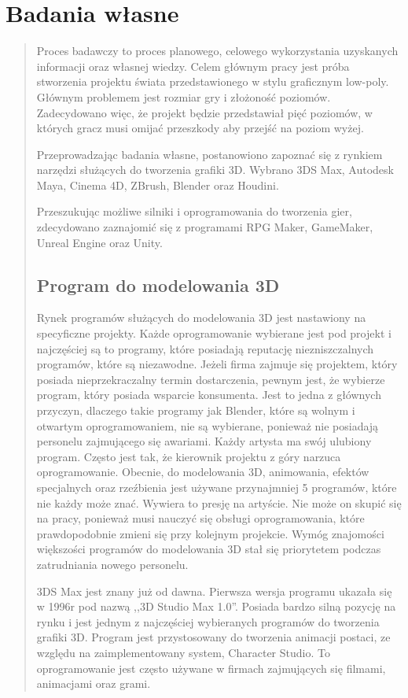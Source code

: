 \chapter{Badania własne}
\begin{quotation}
\indent Proces badawczy to proces planowego, celowego wykorzystania uzyskanych informacji oraz własnej wiedzy. Celem głównym pracy jest próba stworzenia projektu świata przedstawionego w stylu graficznym low-poly. Głównym problemem jest rozmiar gry i złożoność poziomów. Zadecydowano więc, że projekt będzie przedstawiał pięć poziomów, w których gracz musi omijać przeszkody aby przejść na poziom wyżej.

\indent Przeprowadzając badania własne, postanowiono zapoznać się z rynkiem narzędzi służących do tworzenia grafiki 3D. Wybrano 3DS Max, Autodesk Maya, Cinema 4D, ZBrush, Blender oraz Houdini.

\indent Przeszukując możliwe silniki i oprogramowania do tworzenia gier, zdecydowano zaznajomić się z programami RPG Maker, GameMaker, Unreal Engine oraz Unity.
\section{Program do modelowania 3D}

\indent Rynek programów służących do modelowania 3D jest nastawiony na specyficzne projekty. Każde oprogramowanie wybierane jest pod projekt i najczęściej są to programy, które posiadają reputację niezniszczalnych programów, które są niezawodne. Jeżeli firma zajmuje się projektem, który posiada nieprzekraczalny termin dostarczenia, pewnym jest, że wybierze program, który posiada wsparcie konsumenta. Jest to jedna z głównych przyczyn, dlaczego takie programy jak Blender, które są wolnym i otwartym oprogramowaniem, nie są wybierane, ponieważ nie posiadają personelu zajmującego się awariami. Każdy artysta ma swój ulubiony program. Często jest tak, że kierownik projektu z góry narzuca oprogramowanie. Obecnie, do modelowania 3D, animowania, efektów specjalnych oraz rzeźbienia jest używane przynajmniej 5 programów, które nie każdy może znać. Wywiera to presję na artyście. Nie może on skupić się na pracy, ponieważ musi nauczyć się obsługi oprogramowania, które prawdopodobnie zmieni się przy kolejnym projekcie. Wymóg znajomości większości programów do modelowania 3D stał się priorytetem podczas zatrudniania nowego personelu.

\indent 3DS Max jest znany już od dawna. Pierwsza wersja programu ukazała się w 1996r pod nazwą ,,3D Studio Max 1.0''. Posiada bardzo silną pozycję na rynku i jest jednym z najczęściej wybieranych programów do tworzenia grafiki 3D. Program jest przystosowany do tworzenia animacji postaci, ze względu na zaimplementowany system, Character Studio. To oprogramowanie jest często używane w firmach zajmujących się filmami, animacjami oraz grami.


\end{quotation}
